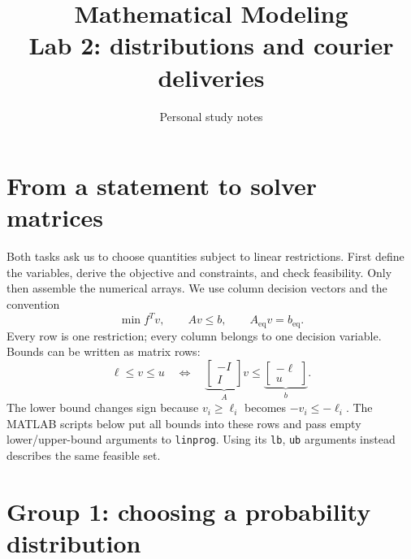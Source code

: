 \documentclass[11pt,a4paper]{article}
\title{\textbf{Mathematical Modeling}\\[2mm]\large Lab 2: distributions and courier deliveries}
\author{Personal study notes}
\date{}
\begin{document}
\maketitle
\tableofcontents

\section{From a statement to solver matrices}
Both tasks ask us to choose quantities subject to linear restrictions. First
define the variables, derive the objective and constraints, and check feasibility.
Only then assemble the numerical arrays. We use column decision vectors and the
convention
\[
  \min f^Tv,\qquad Av\leq b,\qquad A_{\mathrm{eq}}v=b_{\mathrm{eq}}.
\]
Every row is one restriction; every column belongs to one decision variable.
Bounds can be written as matrix rows:
\[
  \ell\leq v\leq u
  \quad\Longleftrightarrow\quad
  \underbrace{\begin{bmatrix}-I\\I\end{bmatrix}}_{A}v
  \leq\underbrace{\begin{bmatrix}-\ell\\u\end{bmatrix}}_b.
\]
The lower bound changes sign because $v_i\geq\ell_i$ becomes
$-v_i\leq-\ell_i$. The MATLAB scripts below put all bounds into these rows
and pass empty lower/upper-bound arguments to \texttt{linprog}. Using its
\texttt{lb}, \texttt{ub} arguments instead describes the same feasible set.

\section{Group 1: choosing a probability distribution}\label{sec:probability}
\end{document}
